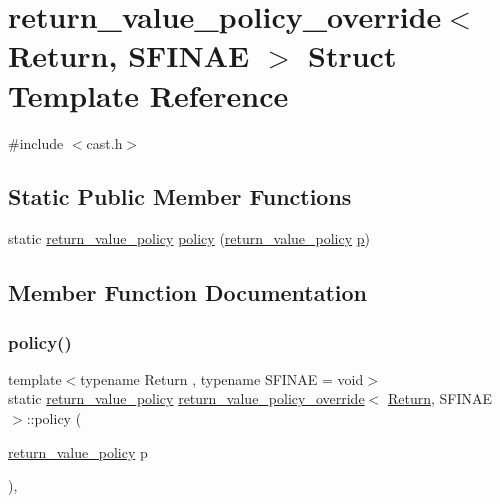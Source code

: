 \hypertarget{structreturn__value__policy__override}{}\section{return\+\_\+value\+\_\+policy\+\_\+override$<$ Return, S\+F\+I\+N\+AE $>$ Struct Template Reference}
\label{structreturn__value__policy__override}


{\ttfamily \#include $<$cast.\+h$>$}

\subsection*{Static Public Member Functions}
\begin{DoxyCompactItemize}
\item 
static \mbox{\hyperlink{detail_2common_8h_adde72ab1fb0dd4b48a5232c349a53841}{return\+\_\+value\+\_\+policy}} \mbox{\hyperlink{structreturn__value__policy__override_a65da8355449984fac8a8b4f5bfa70748}{policy}} (\mbox{\hyperlink{detail_2common_8h_adde72ab1fb0dd4b48a5232c349a53841}{return\+\_\+value\+\_\+policy}} \mbox{\hyperlink{_s_d_l__opengl__glext_8h_aa5367c14d90f462230c2611b81b41d23}{p}})
\end{DoxyCompactItemize}


\subsection{Member Function Documentation}
\mbox{\label{structreturn__value__policy__override_a65da8355449984fac8a8b4f5bfa70748}} 
\subsubsection{\texorpdfstring{policy()}{policy()}}
{\footnotesize\ttfamily template$<$typename Return , typename S\+F\+I\+N\+AE  = void$>$ \\
static \mbox{\hyperlink{detail_2common_8h_adde72ab1fb0dd4b48a5232c349a53841}{return\+\_\+value\+\_\+policy}} \mbox{\hyperlink{structreturn__value__policy__override}{return\+\_\+value\+\_\+policy\+\_\+override}}$<$ \mbox{\hyperlink{_python-ast_8h_abdae7f49d66ce8e500825bb53aa14901}{Return}}, S\+F\+I\+N\+AE $>$\+::policy (\begin{DoxyParamCaption}\item[{\mbox{\hyperlink{detail_2common_8h_adde72ab1fb0dd4b48a5232c349a53841}{return\+\_\+value\+\_\+policy}}}]{p }\end{DoxyParamCaption})\hspace{0.3cm}{\ttfamily [inline]}, {\ttfamily [static]}}



